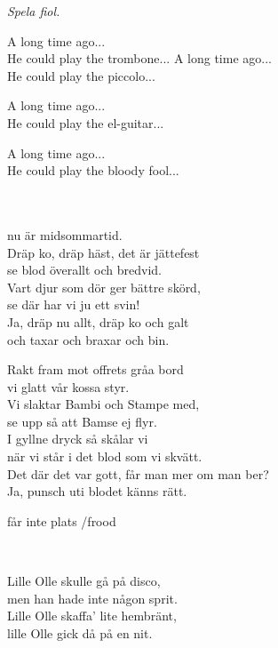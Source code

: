 {{\scriptsize{\textit{Spela fiol.}}

\songtext{} A long time ago...\\
He could play the trombone...
\newpage
A long time ago...\\
He could play the piccolo...

A long time ago...\\
He could play the el-guitar...

A long time ago...\\
He could play the bloody fool...\\

 \\       

 \\  
			nu är midsommartid. \\ 
			Dräp ko, dräp häst, det är jättefest \\ 
			se blod överallt och bredvid. \\ 
			Vart djur som dör ger bättre skörd, \\ 
			se där har vi ju ett svin! \\ 
			Ja, dräp nu allt, dräp ko och galt \\ 
			och taxar och braxar och bin.
            
            Rakt fram mot offrets gråa bord \\ 
			vi glatt vår kossa styr. \\ 
			Vi slaktar Bambi och Stampe med, \\ 
			se upp så att Bamse ej flyr. \\ 
			I gyllne dryck så skålar vi \\ 
			när vi står i det blod som vi skvätt. \\ 
			Det där det var gott, får man mer om man ber? \\ 
			Ja, punsch uti blodet känns rätt.

 får inte plats /frood

\newpage 


 \\       
\author{Text: Calle Isaksson}

\songtext{}
Lille Olle skulle gå på disco,\\
men han hade inte någon sprit.\\
Lille Olle skaffa' lite hembränt,\\
lille Olle gick då på en nit.

}}
